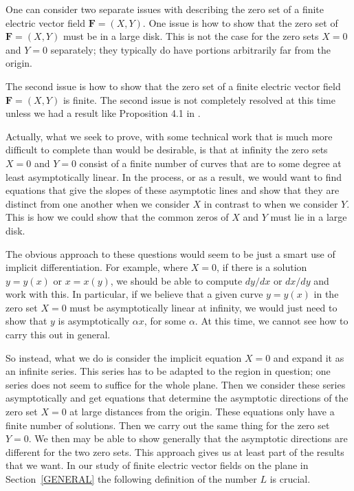 \documentclass{article}
\theoremstyle{remark}
\numberwithin{equation}{section}
\begin{document}
One can consider two separate issues with describing the zero set of a finite electric vector field ${\mathbf F}=(X,Y)$.  One issue is how to show that the zero set of 
${\mathbf F}=(X,Y)$ must be in a large disk. This is not the case for the zero sets $X=0$ and $Y=0$ separately; they typically do have portions arbitrarily far from the origin. 

The second issue is how to show that the zero set of a finite electric vector field ${\mathbf F}=(X,Y)$ is finite. The second issue is not completely resolved 
at this time unless we had a result like Proposition 4.1 in \cite{AHKT}.

Actually, what we seek to prove, with some technical work that is much more difficult to complete than would be desirable, 
is that at infinity the zero sets $X=0$ and  $Y=0$ consist of a finite number of curves that are to some degree at least 
asymptotically linear. In the process, or as a result, we would want to find equations that give the slopes of these asymptotic 
lines and show that they are distinct from one another when we consider $X$ in contrast to when we consider $Y$. This is how we could 
show that the common zeros of $X$ and $Y$ must lie in a large disk.
  
The obvious approach to these questions would seem to be just a smart use of implicit differentiation.  For example, where $X=0$, if there is a solution $y = y(x)$ 
or $x = x(y)$, we should be able to compute $dy/dx$ or $dx/dy$ and work with this.  In particular, if we believe that a given curve $y = y(x)$ in the zero set $X=0$ 
must be asymptotically linear at infinity, we would just need to show that $y$ is asymptotically $\alpha x$, for some $\alpha$.  At this time, we cannot see how to carry 
this out in general.

So instead, what we do is consider the implicit equation $X=0$ and expand it as an infinite series.  This series has to be adapted to the region in question; 
one series does not seem to suffice for the whole plane.  Then we consider these series asymptotically and get equations that determine the asymptotic directions of the 
zero set $X=0$ at large distances from the origin.  These equations only have a finite number of solutions.  Then we carry out the same thing for the zero set $Y=0$.  
We then may be able to show generally that the asymptotic directions are different for the two zero sets.  This approach gives us at least part of the results that we want.   
In our study of finite electric vector fields on the plane in Section~\ref{GENERAL} the following definition of the number $L$ is crucial.
\end{document}
